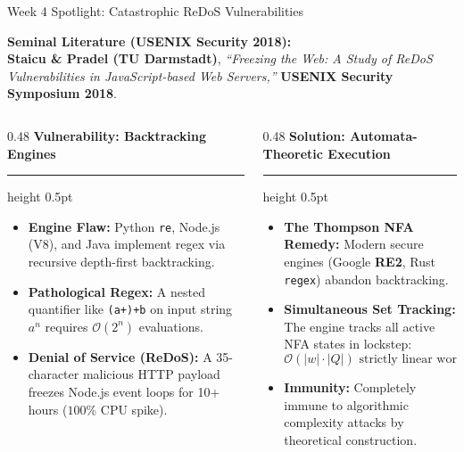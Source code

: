 \documentclass[aspectratio=169, 10pt]{beamer}
\newcommand{\colheader}[1]{%
  {\noindent\footnotesize\bfseries\color{gimpanavy}#1}%
  \vspace{0.03cm}%
  {\color{gimpanavy!30}\hrule height 0.5pt}%
  \vspace{0.08cm}%
}
\begin{document}
\begin{frame}{Week 4 Spotlight: Catastrophic ReDoS Vulnerabilities}
  \begin{tcolorbox}[spotlightcard]
    \footnotesize
    \textbf{Seminal Literature (USENIX Security 2018):} \\
    \textbf{Staicu \& Pradel (TU Darmstadt)}, \textit{``Freezing the Web: A Study of ReDoS Vulnerabilities in JavaScript-based Web Servers,''} \textbf{USENIX Security Symposium 2018}.
  \end{tcolorbox}

  \vspace{0.06cm}
  \begin{columns}[T]
    \begin{column}{0.48\textwidth}
      \colheader{Vulnerability: Backtracking Engines}
      \begin{tcolorbox}[alertcard]
        \begin{itemize}\setlength{\itemsep}{2.5pt}\scriptsize
          \item \textbf{Engine Flaw:} Python \texttt{re}, Node.js (V8), and Java implement regex via recursive depth-first backtracking.
          \item \textbf{Pathological Regex:} A nested quantifier like \texttt{(a+)+b} on input string $a^n$ requires $\mathcal{O}(2^n)$ evaluations.
          \item \textbf{Denial of Service (ReDoS):} A 35-character malicious HTTP payload freezes Node.js event loops for 10+ hours ($100\%$ CPU spike).
        \end{itemize}
      \end{tcolorbox}
    \end{column}

    \hfill

    \begin{column}{0.48\textwidth}
      \colheader{Solution: Automata-Theoretic Execution}
      \begin{tcolorbox}[conceptcard]
        \begin{itemize}\setlength{\itemsep}{2.5pt}\scriptsize
          \item \textbf{The Thompson NFA Remedy:} Modern secure engines (Google \textbf{RE2}, Rust \texttt{regex}) abandon backtracking.
          \item \textbf{Simultaneous Set Tracking:} The engine tracks all active NFA states in lockstep:
            $$\mathcal{O}(|w| \cdot |Q|) \text{ strictly linear worst-case time!}$$
          \item \textbf{Immunity:} Completely immune to algorithmic complexity attacks by theoretical construction.
        \end{itemize}
      \end{tcolorbox}
    \end{column}
  \end{columns}
\end{frame}
\end{document}
